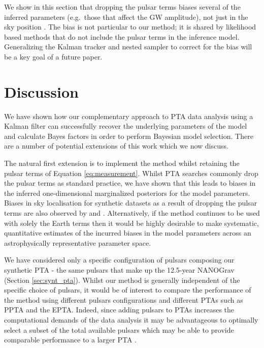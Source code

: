 \documentclass[fleqn,usenatbib,useAMS]{mnras}
\begin{document}
We show in this section that dropping the pulsar terms biases several of the inferred parameters (e.g.\ those that affect the GW amplitude), not just in the sky position  \citep[e.g.][]{Zhupulsarterms,Chen2022}. The bias is not particular to our method; it is shared by likelihood based methods that do not include the pulsar terms in the inference model. Generalizing the Kalman tracker and nested sampler to correct for the bias will be a key goal of a future paper. 


\section{Discussion}\label{sec:discussion}
We have shown how our complementary approach to PTA data analysis using a Kalman filter can successfully recover the underlying parameters of the model and calculate Bayes factors in order to perform Bayesian model selection. There are a number of potential extensions of this work which we now discuss.  \newline 

The natural first extension is to implement the method whilst retaining the pulsar terms of Equation \ref{eq:measurement}. Whilst PTA searches commonly drop the pulsar terms as standard practice, we have shown that this leads to biases in the inferred one-dimensional marginalized posteriors for the model parameters. Biases in sky localisation for synthetic datasets as a result of dropping the pulsar terms are also observed by \cite{Zhupulsarterms} and \cite{Chen2022}. Alternatively, if the method continues to be used with solely the Earth terms then it would be highly desirable to make systematic, quantitative estimates of the incurred biases in the model parameters across an astrophysically representative parameter space. \newline 

We have considered only a specific configuration of pulsars composing our synthetic PTA - the same pulsars that make up the 12.5-year NANOGrav (Section \ref{sec:synt_pta}). Whilst our method is generally independent of the specific choice of pulsars, it would be of interest to compare the performance of the method using different pulsars configurations and different PTAs such as PPTA and the EPTA. Indeed, since adding pulsars to PTAs increases the computational demands of the data analysis it may be advantageous to optimally select a subset of the total available pulsars which may be able to provide comparable performance to a larger PTA  \citep{2023MNRAS.518.1802S}.  \newline 
\end{document}
